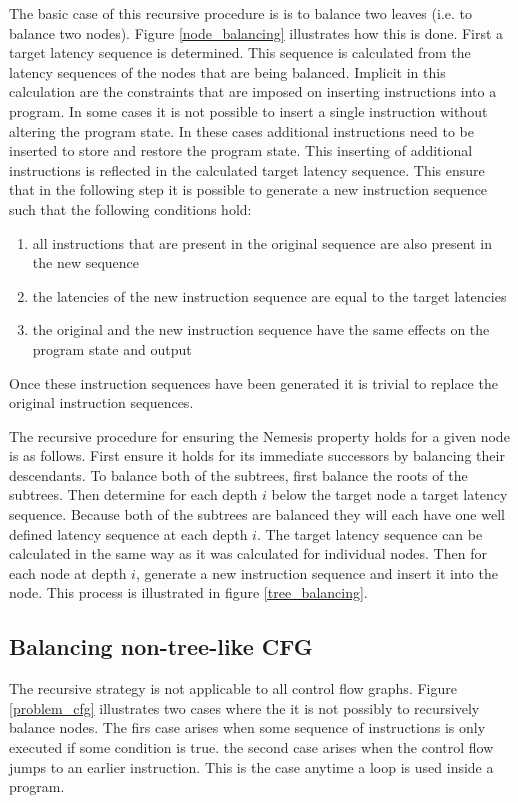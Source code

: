 \documentclass{article}
\begin{document}
The basic case of this recursive procedure is is to balance two leaves (i.e. to balance two nodes). Figure \ref{node_balancing} illustrates how this is done.
First a target latency sequence is determined. This sequence is calculated from the latency sequences of the nodes that are being balanced. 
Implicit in this calculation are the constraints that are imposed on inserting instructions into a program. In some cases it is not possible to insert a single 
instruction without altering the program state. In these cases additional instructions need to be inserted to store and restore the program state. This inserting 
of additional instructions is reflected in the calculated target latency sequence. This ensure that in the following step it is possible to generate a new 
instruction sequence such that the following conditions hold:
\begin{enumerate}
	\itemsep0em
	\item all instructions that are present in the original sequence are also present in the new sequence 
	\item the latencies of the new instruction sequence are equal to the target latencies 
	\item the original and the new instruction sequence have the same effects on the program state and output
\end{enumerate}
Once these instruction sequences have been generated it is trivial to replace the original instruction sequences. 

The recursive procedure for ensuring the Nemesis property holds for a given node is as follows. First ensure it holds for its immediate successors by balancing their descendants. 
To balance both of the subtrees, first balance the roots of the subtrees. Then determine for each depth $i$ below the target node a target latency sequence. 
Because both of the subtrees are balanced they will each have one well defined latency sequence at each depth $i$. The target latency sequence can be calculated 
in the same way as it was calculated for individual nodes. Then for each node at depth $i$, generate a new instruction sequence 
and insert it into the node.   This process is illustrated in figure \ref{tree_balancing}. 

\subsection{Balancing non-tree-like CFG}
The recursive strategy is not applicable to all control flow graphs. Figure \ref{problem_cfg} illustrates two cases where the it is not possibly to recursively balance nodes. The firs case arises when 
some sequence of instructions is only executed if some condition is true. the second case arises when the control flow jumps to an earlier instruction. This is the case anytime a loop is used inside a program. 
\end{document}

